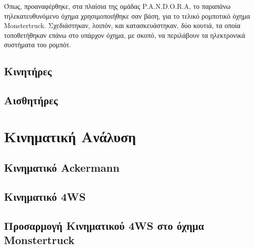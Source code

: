\bigskip\par
Όπως, προαναφέρθηκε, στα πλαίσια της ομάδας P.A.N.D.O.R.A, το παραπάνω τηλεκατευθυνόμενο όχημα 
χρησιμοποιήθηκε σαν βάση, για το τελικό ρομποτικό όχημα Monstertruck. Σχεδιάστηκαν, λοιπόν, και κατασκευάστηκαν, δύο κουτιά, τα οποία τοποθετήθηκαν επάνω στο υπάρχον όχημα, με σκοπό, να περιλάβουν τα ηλεκτρονικά συστήματα του ρομπότ.

\subsection{Κινητήρες}
\subsection{Αισθητήρες}

\section{Κινηματική Ανάλυση}
\subsection{Κινηματικό Ackermann}
\subsection{Κινηματικό 4WS}
\subsection{Προσαρμογή Κινηματικού 4WS στο όχημα Monstertruck}